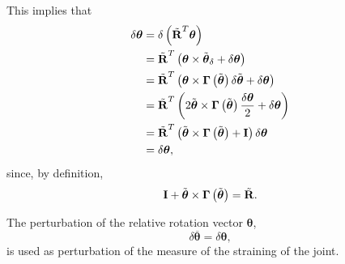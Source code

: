 \documentclass[10pt,dvips,fleqn,subeqn]{report}
\newcommand{\T}[1]{\bm{\mathbf{#1}}}
\begin{document}
This implies that
\begin{align}
	\delta\T{\theta}
	&= \delta\plbr{\tilde{\T{R}}^T \T{\theta}}
	\nonumber \\
	&= \tilde{\T{R}}^T \plbr{
		\T{\theta} \times \tilde{\T{\theta}}_{\delta}
		+ \delta\T{\theta}
	}
	\nonumber \\
	&= \tilde{\T{R}}^T \plbr{
		\T{\theta} \times \T{\Gamma}\plbr{\tilde{\T{\theta}}} \delta\tilde{\T{\theta}}
		+ \delta\T{\theta}
	}
	\nonumber \\
	&= \tilde{\T{R}}^T \plbr{
		2 \tilde{\T{\theta}} \times \T{\Gamma}\plbr{\tilde{\T{\theta}}} \frac{\delta\T{\theta}}{2}
		+ \delta\T{\theta}
	}
	\nonumber \\
	&= \tilde{\T{R}}^T \plbr{
		\tilde{\T{\theta}} \times \T{\Gamma}\plbr{\tilde{\T{\theta}}}
		+ \T{I}
	} \delta\T{\theta}
	\nonumber \\
	&= \delta\T{\theta} ,
\end{align}
since, by definition,
\begin{equation}
	\T{I} + \tilde{\T{\theta}} \times \T{\Gamma}\plbr{\tilde{\T{\theta}}} = \tilde{\T{R}} .
\end{equation}

The perturbation of the relative rotation vector $\T{\theta}$, 
\begin{equation}
	\delta\overline{\T{\theta}} = \delta\T{\theta} ,
\end{equation}
is used as perturbation of the measure of the straining of the joint.
\end{document}
